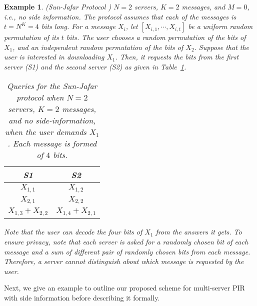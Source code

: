 \documentclass[letterpaper, 10 pt, conference]{ieeeconf}
\newtheorem{example}{Example}
\newcommand{\Xj}[1]{X_{#1}} %
\begin{document}
\begin{example} (Sun-Jafar Protocol \cite{sun2016capacitynoncol}) $N = 2$ servers, $K = 2$ messages, and $M = 0$, i.e., no side information. The protocol assumes that each of the messages is $t = N^K = 4$ bits long. 
For a message $X_{i}$, let $[{X}_{i,1},\cdots,{X}_{i,t}]$ be a uniform random permutation of its $t$ bits. The user chooses a random permutation of the bits of $X_1$, and an independent random permutation of the bits of $X_2$. Suppose that the user is interested in downloading $X_1$. Then, it requests the bits from the first server (S1) and the second server (S2) as given in Table~\ref{tbl:example}.

\begin{table}[!h]
\begin{center}
\begin{tabular}{|c|c|}
\hline
S1 & S2\\
\hline
${X}_{1,1}$%
& ${X}_{1,2}$\\ %
${X}_{2,1}$ %
& ${X}_{2,2}$\\ %
${X}_{1,3} + {X}_{2,2}$ %
& ${X}_{1,4} + {X}_{2,1}$\\ %
\hline
\end{tabular}
\end{center}
\caption{Queries for the Sun-Jafar protocol when $N = 2$ servers, $K = 2$ messages, and no side-information, when the user demands $X_1$. Each message is formed of  $4$ bits. 
}
\label{tbl:example}
\end{table}
Note that the user can decode the four bits of $X_1$ from the answers it gets. To ensure  privacy, note that each server is asked for a randomly chosen bit of each message and a sum of different pair of randomly chosen bits from each message. Therefore, a server cannot distinguish about which message is requested by the user. 
\end{example}

Next, we give an example to outline our proposed scheme for multi-server PIR with side information before describing it formally.
\end{document}
